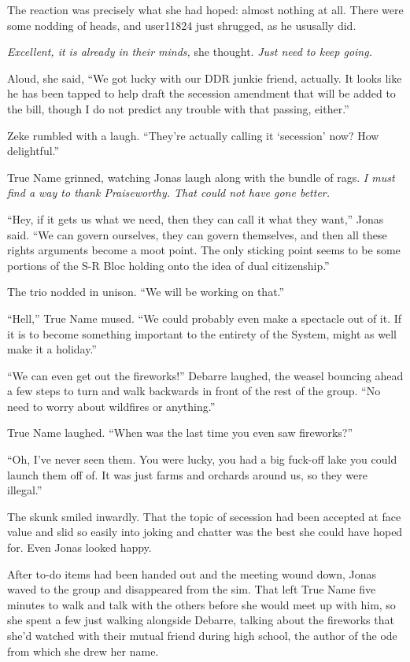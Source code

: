 The reaction was precisely what she had hoped: almost nothing at all. There were some nodding of heads, and user11824 just shrugged, as he ususally did.

\emph{Excellent, it is already in their minds,} she thought. \emph{Just need to keep going.}

Aloud, she said, ``We got lucky with our DDR junkie friend, actually. It looks like he has been tapped to help draft the secession amendment that will be added to the bill, though I do not predict any trouble with that passing, either.''

Zeke rumbled with a laugh. ``They're actually calling it `secession' now? How delightful.''

True Name grinned, watching Jonas laugh along with the bundle of rags. \emph{I must find a way to thank Praiseworthy. That could not have gone better.}

``Hey, if it gets us what we need, then they can call it what they want,'' Jonas said. ``We can govern ourselves, they can govern themselves, and then all these rights arguments become a moot point. The only sticking point seems to be some portions of the S-R Bloc holding onto the idea of dual citizenship.''

The trio nodded in unison. ``We will be working on that.''

``Hell,'' True Name mused. ``We could probably even make a spectacle out of it. If it is to become something important to the entirety of the System, might as well make it a holiday.''

``We can even get out the fireworks!'' Debarre laughed, the weasel bouncing ahead a few steps to turn and walk backwards in front of the rest of the group. ``No need to worry about wildfires or anything.''

True Name laughed. ``When was the last time you even saw fireworks?''

``Oh, I've never seen them. You were lucky, you had a big fuck-off lake you could launch them off of. It was just farms and orchards around us, so they were illegal.''

The skunk smiled inwardly. That the topic of secession had been accepted at face value and slid so easily into joking and chatter was the best she could have hoped for. Even Jonas looked happy.

After to-do items had been handed out and the meeting wound down, Jonas waved to the group and disappeared from the sim. That left True Name five minutes to walk and talk with the others before she would meet up with him, so she spent a few just walking alongside Debarre, talking about the fireworks that she'd watched with their mutual friend during high school, the author of the ode from which she drew her name.

